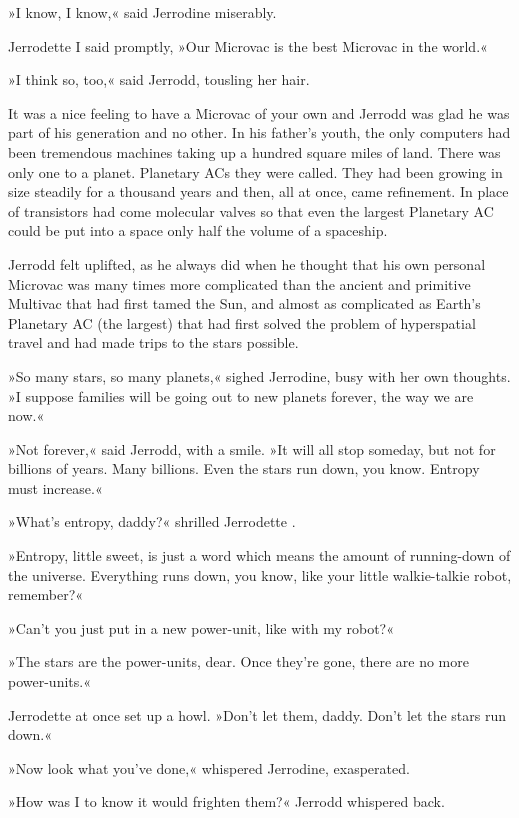 \documentclass[11pt,twocolumn,paper=a5,pagesize,twoside]{scrartcl}
\newcommand{\q}[1]{»#1«}
\begin{document}
{\q{I know, I know,} said Jerrodine miserably.

Jerrodette I said promptly, \q{Our Microvac is the best Microvac in the 
world.}

\q{I think so, too,} said Jerrodd, tousling her hair.

It was a nice feeling to have a Microvac of your own and Jerrodd was glad he 
was part of his generation and no other. In his father's youth, the only 
computers had been tremendous machines taking up a hundred square miles of 
land. There was only one to a planet. Planetary ACs they were called. They 
had been growing in size steadily for a thousand years and then, all at 
once, came refinement. In place of transistors had come molecular valves so 
that even the largest Planetary AC could be put into a space only half the 
volume of a spaceship.

Jerrodd felt uplifted, as he always did when he thought that his own personal 
Microvac was many times more complicated than the ancient and primitive 
Multivac that had first tamed the Sun, and almost as complicated as Earth's 
Planetary AC (the largest) that had first solved the problem of hyperspatial 
travel and had made trips to the stars possible.

\q{So many stars, so many planets,} sighed Jerrodine, busy with her own 
thoughts. \q{I suppose families will be going out to new planets forever, 
the way we are now.}

\q{Not forever,} said Jerrodd, with a smile. \q{It will all stop someday, 
but not for billions of years. Many billions. Even the stars run down, 
you know. Entropy must increase.}

\q{What's entropy, daddy?} shrilled Jerrodette 
\MakeUppercase{}.

\q{Entropy, little sweet, is just a word which means the amount of 
running-down of the universe. Everything runs down, you know, like your 
little walkie-talkie robot, remember?}

\q{Can't you just put in a new power-unit, like with my robot?}

\q{The stars are the power-units, dear. Once they're gone, there are no 
more power-units.}

Jerrodette \MakeUppercase{} at once set up a howl. \q{Don't
let them, daddy. Don't let the stars run down.}

\q{Now look what you've done,} whispered Jerrodine, exasperated.

\q{How was I to know it would frighten them?} Jerrodd whispered back.

}
\end{document}
